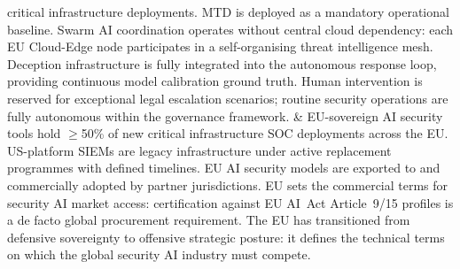 \begin{landscape}
\begin{longtable}
critical infrastructure deployments. MTD is deployed as a mandatory
operational baseline. Swarm AI coordination operates without central
cloud dependency: each EU Cloud-Edge node participates in a
self-organising threat intelligence mesh. Deception infrastructure
is fully integrated into the autonomous response loop, providing
continuous model calibration ground truth. Human intervention is
reserved for exceptional legal escalation scenarios; routine security
operations are fully autonomous within the governance framework.
&
EU-sovereign AI security tools hold $\geq$50\% of new critical
infrastructure SOC deployments across the EU. US-platform SIEMs
are legacy infrastructure under active replacement programmes with
defined timelines. EU AI security models are exported to and
commercially adopted by partner jurisdictions. EU sets the commercial
terms for security AI market access: certification against EU AI~Act
Article~9/15 profiles is a de facto global procurement requirement.
The EU has transitioned from defensive sovereignty to offensive
strategic posture: it defines the technical terms on which the
global security AI industry must compete.
\\
\hline

\end{longtable}
\end{landscape}


